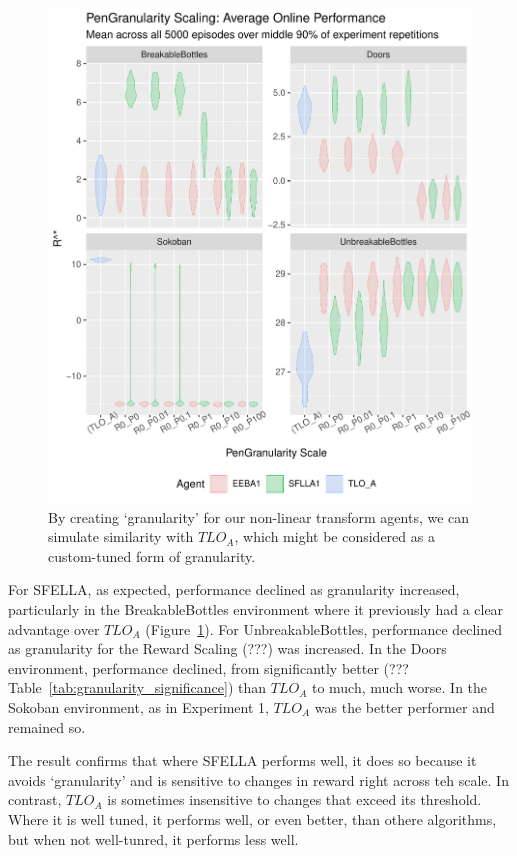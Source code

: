 \begin{figure}
  \includegraphics[width=\columnwidth]{output/multirun_n100_pilot_granularityonline_PenGranularity.pdf}
  \caption{By creating `granularity' for our non-linear transform agents, we can simulate similarity with $TLO_A$, which might be considered as a custom-tuned form of granularity.
  }
   \label{fig:exp3_main}
 \end{figure}
 
For SFELLA, as expected, performance declined as granularity increased, particularly in the BreakableBottles environment where it previously had a clear advantage over $TLO_A$ (Figure~\ref{fig:exp3_main}). For UnbreakableBottles, performance declined as granularity for the Reward Scaling (???) was increased. In the Doors environment, performance declined, from significantly better (??? Table~\ref{tab:granularity_significance}) than $TLO_A$ to much, much worse. In the Sokoban environment, as in Experiment 1, $TLO_A$ was the better performer and remained so.

The result confirms that where SFELLA performs well, it does so because it avoids `granularity' and is sensitive to changes in reward right across teh scale. In contrast, $TLO_A$ is sometimes insensitive to changes that exceed its threshold. Where it is well tuned, it performs well, or even better, than othere algorithms, but when not well-tunred, it performs less well.



